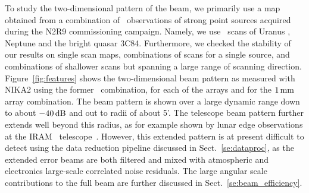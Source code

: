 To study the two-dimensional pattern of the beam, we 
primarily use a map obtained from a combination of \bm\ observations
of strong point sources acquired during the N2R9 commissioning campaign.
Namely, we use \bm\ scans of Uranus%
,  Neptune %
and the bright quasar 3C84. %
Furthermore, we checked the stability of our results on single scan
maps, combinations of scans for a single source, and combinations of
shallower scans but spanning a large range of scanning direction. 
{\lp Figure~\ref{fig:features} shows the two-dimensional beam pattern
as measured with NIKA2 using the former \bm\ combination, for each of
the arrays and for the $1\,\rm{mm}$ array combination.}
{\lp The beam pattern is shown over a large dynamic range down
to about $-40\,\rm{dB}$ and out to radii of about 5’.
The telescope beam pattern further extends well beyond this radius, as for
example shown by lunar edge observations
at the IRAM \trentemetre\ telescope~\citep{Greve1998,
Kramer2013}. However,
this extended pattern is at present difficult to detect using the data
reduction pipeline discussed in Sect.~\ref{se:dataproc}, as
the extended error beams are both filtered and mixed with 
atmospheric and electronics large-scale correlated noise
residuals. The large angular scale contributions to the full beam are
further discussed in Sect.~\ref{se:beam_efficiency}.} 




